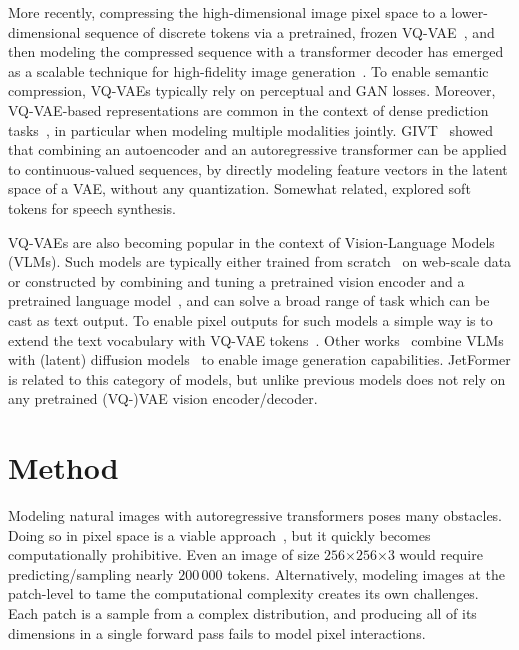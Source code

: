 \documentclass{article} %
\newcommand{\name}{JetFormer\xspace}
\begin{document}
More recently, compressing the high-dimensional image pixel space to a lower-dimensional sequence of discrete tokens via a pretrained, frozen VQ-VAE~\citep{van2017neural,razavi2019generating}, and then modeling the compressed sequence with a transformer decoder has emerged as a scalable technique for high-fidelity image generation~\citep{esser2020taming, yu2021vector, ramesh2021zero, yu2022scaling, gafni2022make}. To enable semantic compression, VQ-VAEs typically rely on perceptual and GAN losses. Moreover, VQ-VAE-based representations are common in the context of dense prediction tasks~\citep{kolesnikov2022uvim, lu2022unified, mizrahi20244m, mentzer2023finite}, in particular when modeling multiple modalities jointly. GIVT~\citep{tschannen2023givt} showed that combining an autoencoder and an autoregressive transformer can be applied to continuous-valued sequences, by directly modeling feature vectors in the latent space of a VAE, without any quantization. Somewhat related, \citep{nachmani2023lms, meng2024autoregressive} explored soft tokens for speech synthesis.

VQ-VAEs are also becoming popular in the context of Vision-Language Models (VLMs). Such models are typically either trained from scratch~\citep{clip,align, simvlm_22, yu2022coca} on web-scale data or constructed by combining and tuning a pretrained vision encoder and a pretrained language model~\citep{flamingo_paper_22, chen2022pali, git2_22, blip2, kosmos, liu2024visual, beyer2024paligemma}, and can solve a broad range of task which can be cast as text output. To enable pixel outputs for such models a simple way is to extend the text vocabulary with VQ-VAE tokens~\citep{aghajanyan2022cm3, kim2023magvlt, aghajanyan2023scaling, you2023cobit, pan2024auto}. Other works~\citep{dongdreamllm, ge2024seed, zhou2024transfusion} combine VLMs with (latent) diffusion models~\citep{sohl2015deep, dhariwal2021diffusion, rombach2021high, saharia2022photorealistic, ramesh2022hierarchical} to enable image generation capabilities. \name is related to this category of models, but unlike previous models does not rely on any pretrained (VQ-)VAE vision encoder/decoder.


\section{Method}

Modeling natural images with autoregressive transformers poses many obstacles. Doing so in pixel space is a viable approach~\citep{parmar2018image,chen2020generative}, but it quickly becomes computationally prohibitive. Even an image of size $256$$\times$$256$$\times$$3$ would require predicting/sampling nearly $200\,000$ tokens.
Alternatively, modeling images at the patch-level to tame the computational complexity creates its own challenges. Each patch is a sample from a complex distribution, and producing all of its dimensions in a single forward pass fails to model pixel interactions.
\end{document}
